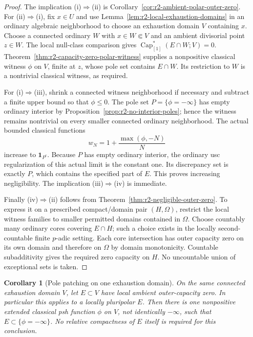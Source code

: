 \documentclass[11pt,a4paper]{article}
\numberwithin{equation}{section}
\newtheorem{corollary}[theorem]{Corollary}
\theoremstyle{definition}
\theoremstyle{remark}
\begin{document}
\begin{proof}
The implication (i)$\Rightarrow$(ii) is
Corollary~\ref{cor:r2-ambient-polar-outer-zero}.
For (ii)$\Rightarrow$(i), fix $x\in U$ and use
Lemma~\ref{lem:r2-local-exhaustion-domains} in an ordinary algebraic
neighborhood to choose an exhaustion domain $V$ containing $x$.
Choose a connected ordinary $W$ with $x\in W\Subset V$ and an
ambient divisorial point $z\in W$. The local null-class comparison
gives $\operatorname{Cap}_{[1]}^*(E\cap W;V)=0$.
Theorem~\ref{thm:r2-capacity-zero-polar-witness} supplies a
nonpositive classical witness $\phi$ on $V$, finite at $z$, whose
pole set contains $E\cap W$. Its restriction to $W$ is a
nontrivial classical witness, as required.

For (i)$\Rightarrow$(iii), shrink a connected witness neighborhood
if necessary and subtract a finite upper bound so that $\phi\leq0$.
The pole set $P=\{\phi=-\infty\}$ has empty ordinary interior by
Proposition~\ref{prop:r2-no-interior-poles}; hence the witness remains
nontrivial on every smaller connected ordinary neighborhood.
The actual bounded classical functions
\[
 w_N=1+\frac{\max(\phi,-N)}{N}
\]
increase to $\mathbf1_{P^c}$. Because $P$ has empty ordinary
interior, the ordinary usc regularization of this actual limit is
the constant one. Its discrepancy set is exactly $P$, which
contains the specified part of $E$. This proves increasing
negligibility. The implication (iii)$\Rightarrow$(iv) is immediate.

Finally (iv)$\Rightarrow$(ii) follows from
Theorem~\ref{thm:r2-negligible-outer-zero}. To express it on a
prescribed compact/domain pair $(H,\Omega)$, restrict the local
witness families to smaller permitted domains contained in $\Omega$.
Choose countably many ordinary cores covering $E\cap H$; such a
choice exists in the locally second-countable finite $p$-adic
setting. Each core intersection has outer capacity zero on its
own domain and therefore on $\Omega$ by domain monotonicity.
Countable subadditivity gives the required zero capacity on $H$.
No uncountable union of exceptional sets is taken.
\end{proof}

\begin{corollary}[Pole patching on one exhaustion domain]
\label{cor:r2-exhaustion-domain-pole-patching}
On the same connected exhaustion domain $V$, let $E\subset V$
have local ambient outer-capacity zero. In particular this applies
to a locally pluripolar $E$. Then there is one nonpositive extended
classical psh function $\phi$ on $V$, not identically $-\infty$,
such that $E\subset\{\phi=-\infty\}$. No relative compactness
of $E$ itself is required for this conclusion.
\end{corollary}
\end{document}
